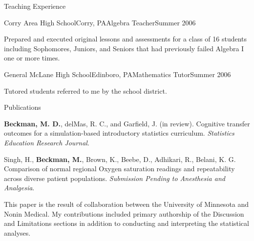 \documentclass{resume} %
\begin{document}
\begin{rSection}{Teaching Experience}
	\begin{rSubsection}{Corry Area High School}{Corry, PA}{Algebra Teacher}{Summer 2006}
		\item[] Prepared and executed original lessons and assessments for a class of 16 students including Sophomores, Juniors, and Seniors that had previously failed Algebra I one or more times.
	\end{rSubsection}
	
		

	
	\begin{rSubsection}{General McLane High School}{Edinboro, PA}{Mathematics Tutor}{Summer 2006}
		\item[] Tutored students referred to me by the school district.
	\end{rSubsection}
	
	
\end{rSection}




\begin{rSection}{Publications}

\textbf{Beckman, M. D.}, delMas, R. C., and Garfield, J. (in review). Cognitive transfer outcomes for a simulation-based introductory statistics curriculum. \textit{Statistics Education Research Journal}.\vspace{0.5em}

Singh, H.,  \textbf{Beckman, M.},  Brown, K., Beebe, D., Adhikari, R., Belani, K. G. Comparison of normal regional Oxygen saturation readings and repeatability across diverse patient populations. \textit{Submission Pending to Anesthesia and Analgesia}. %
	\begin{rSubsection}{}{}{}{}
		\item[]  This paper is the result of collaboration between the University of Minnesota and Nonin Medical. My contributions included primary authorship of the Discussion and Limitations sections in addition to conducting and interpreting the statistical analyses. 		
	\end{rSubsection}
	
\end{rSection}
\end{document}
